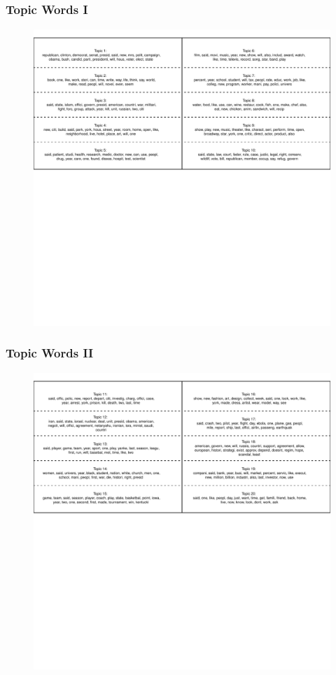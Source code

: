 \documentclass{beamer}
\begin{document}
\subsection{}
\begin{frame}%
  \frametitle{Topic Words I}
  \begin{figure}
  \includegraphics[width = \textwidth]{../calc/fig/words_top.pdf}
  \end{figure}
\end{frame}

\begin{frame}%
  \frametitle{Topic Words II}
  \begin{figure}
  \includegraphics[width = \textwidth]{../calc/fig/words_bottom.pdf}
  \end{figure}
\end{frame}
\end{document}
